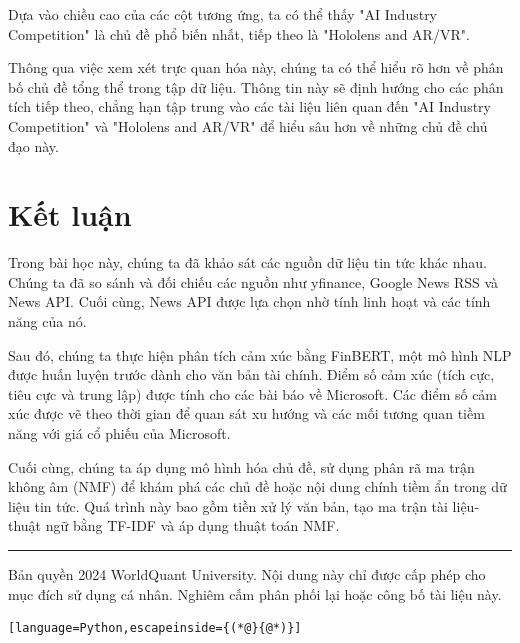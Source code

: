 Dựa vào chiều cao của các cột tương ứng, ta có thể thấy "AI Industry Competition" là chủ đề phổ biến nhất, tiếp theo là "Hololens and AR/VR".

Thông qua việc xem xét trực quan hóa này, chúng ta có thể hiểu rõ hơn về phân bố chủ đề tổng thể trong tập dữ liệu. Thông tin này sẽ định hướng cho các phân tích tiếp theo, chẳng hạn tập trung vào các tài liệu liên quan đến "AI Industry Competition" và "Hololens and AR/VR" để hiểu sâu hơn về những chủ đề chủ đạo này.

\section{Kết luận}

Trong bài học này, chúng ta đã khảo sát các nguồn dữ liệu tin tức khác nhau. Chúng ta đã so sánh và đối chiếu các nguồn như yfinance, Google News RSS và News API. Cuối cùng, News API được lựa chọn nhờ tính linh hoạt và các tính năng của nó.

Sau đó, chúng ta thực hiện phân tích cảm xúc bằng FinBERT, một mô hình NLP được huấn luyện trước dành cho văn bản tài chính. Điểm số cảm xúc (tích cực, tiêu cực và trung lập) được tính cho các bài báo về Microsoft. Các điểm số cảm xúc được vẽ theo thời gian để quan sát xu hướng và các mối tương quan tiềm năng với giá cổ phiếu của Microsoft.

Cuối cùng, chúng ta áp dụng mô hình hóa chủ đề, sử dụng phân rã ma trận không âm (NMF) để khám phá các chủ đề hoặc nội dung chính tiềm ẩn trong dữ liệu tin tức. Quá trình này bao gồm tiền xử lý văn bản, tạo ma trận tài liệu-thuật ngữ bằng TF-IDF và áp dụng thuật toán NMF.

\begin{center}\rule{0.5\linewidth}{0.5pt}\end{center}

Bản quyền 2024 WorldQuant University. Nội dung này chỉ được cấp phép cho mục đích sử dụng cá nhân. Nghiêm cấm phân phối lại hoặc công bố tài liệu này.

\begin{lstlisting}[language=Python,escapeinside={(*@}{@*)}]

\end{lstlisting}
